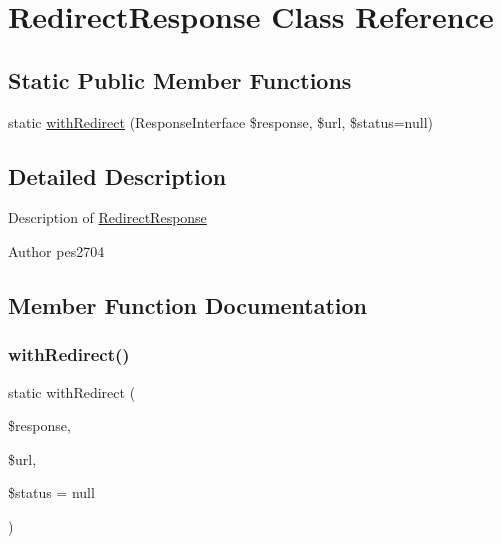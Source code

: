 \hypertarget{class_pes_1_1_http_1_1_response_1_1_redirect_response}{}\section{Redirect\+Response Class Reference}
\label{class_pes_1_1_http_1_1_response_1_1_redirect_response}
\subsection*{Static Public Member Functions}
\begin{DoxyCompactItemize}
\item 
static \mbox{\hyperlink{class_pes_1_1_http_1_1_response_1_1_redirect_response_a0e72ae5d7ce9a3d618b360d6cffdef6f}{with\+Redirect}} (Response\+Interface \$response, \$url, \$status=null)
\end{DoxyCompactItemize}


\subsection{Detailed Description}
Description of \mbox{\hyperlink{class_pes_1_1_http_1_1_response_1_1_redirect_response}{Redirect\+Response}}

\begin{DoxyAuthor}{Author}
pes2704 
\end{DoxyAuthor}


\subsection{Member Function Documentation}
\mbox{\label{class_pes_1_1_http_1_1_response_1_1_redirect_response_a0e72ae5d7ce9a3d618b360d6cffdef6f}} 
\subsubsection{\texorpdfstring{with\+Redirect()}{withRedirect()}}
{\footnotesize\ttfamily static with\+Redirect (\begin{DoxyParamCaption}\item[{Response\+Interface}]{\$response,  }\item[{}]{\$url,  }\item[{}]{\$status = {\ttfamily null} }\end{DoxyParamCaption})\hspace{0.3cm}{\ttfamily [static]}}

